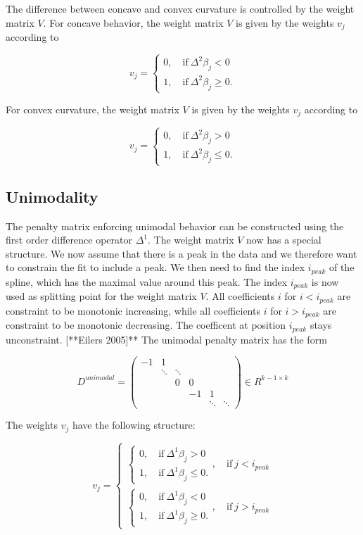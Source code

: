 \documentclass[10pt,a4paper]{article}
\begin{document}
	The difference between concave and convex curvature is controlled by the weight matrix $V$. For concave behavior, the weight matrix $V$ is given by the weights $v_j$ according to
	
	$$v_j = \begin{cases} 0, \quad \text{if} \ \Delta^2\beta_j < 0 \\ 1, \quad \text{if} \ \Delta^2\beta_j \ge 0. \end{cases}$$
	
	For convex curvature, the weight matrix $V$ is given by the weights $v_j$ according to
	
	$$v_j = \begin{cases} 0, \quad \text{if} \ \Delta^2\beta_j > 0 \\ 1, \quad \text{if} \ \Delta^2\beta_j \le 0. \end{cases}$$
	
	\subsection{Unimodality}
	
	The penalty matrix enforcing unimodal behavior can be constructed using the first order difference operator $\Delta^1$. The weight matrix $V$ now has a special structure. We now assume that there is a peak in the data and we therefore want to constrain the fit to include a peak. We then need to find the index $i_{peak}$ of the spline, which has the maximal value around this  peak. The index $i_{peak}$ is now used as splitting point for the weight matrix $V$. All coefficients $i$ for $i < i_{peak}$ are constraint to be monotonic increasing, while all coefficients $i$ for $i > i_{peak}$ are constraint to be monotonic decreasing. The coefficent at position $i_{peak}$ stays unconstraint. [**Eilers 2005]** The unimodal penalty matrix has the form 
	
	$$D^{unimodal} = \begin{pmatrix} -1 & 1 \\ & \ddots & \ddots  \\ & & 0 & 0 \\ & & & -1 & 1 \\ & & & &  \ddots & \ddots \end{pmatrix} \in R^{k-1 \times k}$$
	
	The weights $v_j$ have the following structure:
	
	$$v_j = \begin{cases} \begin{cases} 0, \quad \text{if} \ \Delta^1\beta_j > 0 \\ 
	1, \quad \text{if} \ \Delta^1\beta_j \le 0.\end{cases}, \quad \text{if} \ j < i_{peak} \\ \begin{cases} 0, \quad \text{if} \ \Delta^1\beta_j < 0 \\ 
	1, \quad \text{if} \ \Delta^1\beta_j \ge 0.\end{cases}  , \quad \text{if} \ j > i_ {peak}  \end{cases}$$
	
\end{document}
